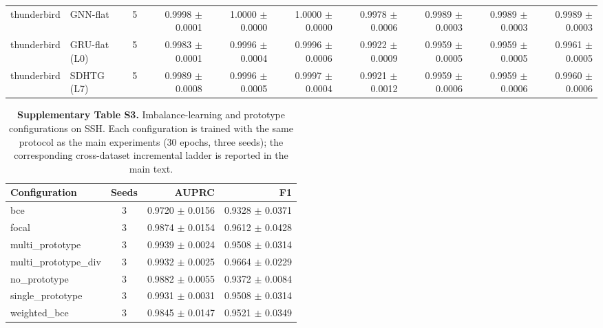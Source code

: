 \documentclass[11pt,a4paper]{article}
\begin{document}
\begin{table}[H]
{{\begin{tabular}{llcrrrrrrr}
thunderbird & GNN-flat & 5 & 0.9998 $\pm$ 0.0001 & 1.0000 $\pm$ 0.0000 & 1.0000 $\pm$ 0.0000 & 0.9978 $\pm$ 0.0006 & 0.9989 $\pm$ 0.0003 & 0.9989 $\pm$ 0.0003 & 0.9989 $\pm$ 0.0003 \\
thunderbird & GRU-flat (L0) & 5 & 0.9983 $\pm$ 0.0001 & 0.9996 $\pm$ 0.0004 & 0.9996 $\pm$ 0.0006 & 0.9922 $\pm$ 0.0009 & 0.9959 $\pm$ 0.0005 & 0.9959 $\pm$ 0.0005 & 0.9961 $\pm$ 0.0005 \\
thunderbird & SDHTG (L7) & 5 & 0.9989 $\pm$ 0.0008 & 0.9996 $\pm$ 0.0005 & 0.9997 $\pm$ 0.0004 & 0.9921 $\pm$ 0.0012 & 0.9959 $\pm$ 0.0006 & 0.9959 $\pm$ 0.0006 & 0.9960 $\pm$ 0.0006 \\
\bottomrule
\end{tabular}
}
}
\end{table}

\begin{table}[H]
\centering
\caption*{\textbf{Supplementary Table S3.} Imbalance-learning and prototype configurations on SSH. Each configuration is trained with the same protocol as the main experiments (30 epochs, three seeds); the corresponding cross-dataset incremental ladder is reported in the main text.}
{\small
\begin{tabular}{lcrr}
\toprule
Configuration & Seeds & AUPRC & F1 \\
\midrule
bce & 3 & 0.9720 $\pm$ 0.0156 & 0.9328 $\pm$ 0.0371 \\
focal & 3 & 0.9874 $\pm$ 0.0154 & 0.9612 $\pm$ 0.0428 \\
multi\_prototype & 3 & 0.9939 $\pm$ 0.0024 & 0.9508 $\pm$ 0.0314 \\
multi\_prototype\_div & 3 & 0.9932 $\pm$ 0.0025 & 0.9664 $\pm$ 0.0229 \\
no\_prototype & 3 & 0.9882 $\pm$ 0.0055 & 0.9372 $\pm$ 0.0084 \\
single\_prototype & 3 & 0.9931 $\pm$ 0.0031 & 0.9508 $\pm$ 0.0314 \\
weighted\_bce & 3 & 0.9845 $\pm$ 0.0147 & 0.9521 $\pm$ 0.0349 \\
\bottomrule
\end{tabular}
}
\end{table}
\end{document}
